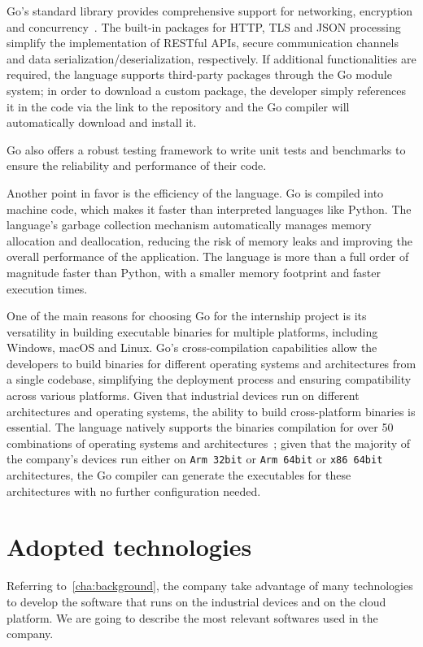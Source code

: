 Go's standard library provides comprehensive support for networking, encryption and concurrency~\cite{go-package-std}. The built-in packages for HTTP, TLS and JSON processing simplify the implementation of RESTful APIs, secure communication channels and data serialization/deserialization, respectively. If additional functionalities are required, the language supports third-party packages through the Go module system; in order to download a custom package, the developer simply references it in the code via the link to the repository and the Go compiler will automatically download and install it.

Go also offers a robust testing framework to write unit tests and benchmarks to ensure the reliability and performance of their code.

Another point in favor is the efficiency of the language. Go is compiled into machine code, which makes it faster than interpreted languages like Python. The language's garbage collection mechanism automatically manages memory allocation and deallocation, reducing the risk of memory leaks and improving the overall performance of the application. The language is more than a full order of magnitude faster than Python, with a smaller memory footprint and faster execution times.~\cite{go-lang-performance}

One of the main reasons for choosing Go for the internship project is its versatility in building executable binaries for multiple platforms, including Windows, macOS and Linux. Go's cross-compilation capabilities allow the developers to build binaries for different operating systems and architectures from a single codebase, simplifying the deployment process and ensuring compatibility across various platforms. Given that industrial devices run on different architectures and operating systems, the ability to build cross-platform binaries is essential. The language natively supports the binaries compilation for over 50 combinations of operating systems and architectures~\cite{go-lang-compilation-combo}; given that the majority of the company's devices run either on \texttt{Arm 32bit} or \texttt{Arm 64bit} or \texttt{x86 64bit} architectures, the Go compiler can generate the executables for these architectures with no further configuration needed.

\section{Adopted technologies}

Referring to~\cref{cha:background}, the company take advantage of many technologies to develop the software that runs on the industrial devices and on the cloud platform. We are going to describe the most relevant softwares used in the company.


